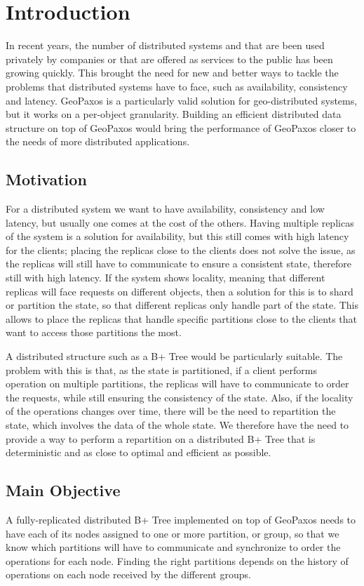 \chapter{Introduction}\label{sec:introduction}
In recent years, the number of distributed systems and that are been used privately by companies or that are offered as services to the public has been growing quickly. This brought the need for new and better ways to tackle the problems that distributed systems have to face, such as availability, consistency and latency. GeoPaxos is a particularly valid solution for geo-distributed systems, but it works on a per-object granularity. Building an efficient distributed data structure on top of GeoPaxos would bring the performance of GeoPaxos closer to the needs of more distributed applications.


\section{Motivation}\label{sec:motivation}
For a distributed system we want to have availability, consistency and low latency, but usually one comes at the cost of the others. Having multiple replicas of the system is a solution for availability, but this still comes with high latency for the clients; placing the replicas close to the clients does not solve the issue, as the replicas will still have to communicate to ensure a consistent state, therefore still with high latency. If the system shows locality, meaning that different replicas will face requests on different objects, then a solution for this is to shard or partition the state, so that different replicas only handle part of the state. This allows to place the replicas that handle specific partitions close to the clients that want to access those partitions the most.

A distributed structure such as a B+ Tree would be particularly suitable. The problem with this is that, as the state is partitioned, if a client performs operation on multiple partitions, the replicas will have to communicate to order the requests, while still ensuring the consistency of the state. Also, if the locality of the operations changes over time, there will be the need to repartition the state, which involves the data of the whole state. We therefore have the need to provide a way to perform a repartition on a distributed B+ Tree that is deterministic and as close to optimal and efficient as possible.

\section{Main Objective}\label{sec:main-objective}
A fully-replicated distributed B+ Tree implemented on top of GeoPaxos needs to have each of its nodes assigned to one or more partition, or group, so that we know which partitions will have to communicate and synchronize to order the operations for each node. Finding the right partitions depends on the history of operations on each node received by the different groups.

